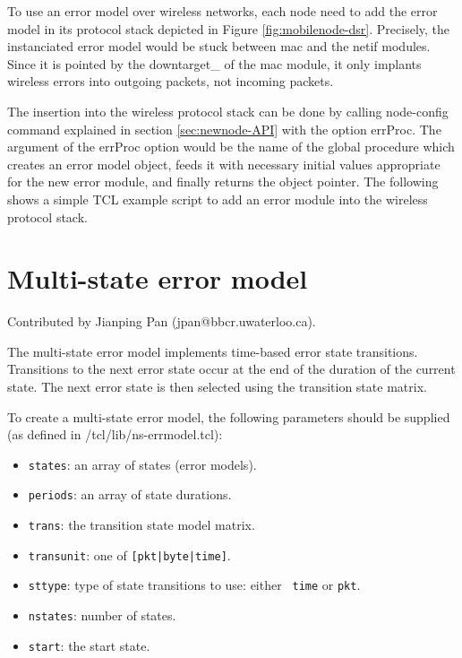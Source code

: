 To use an error model over wireless networks, each node need to add
the error model in its protocol stack depicted in
Figure \ref{fig:mobilenode-dsr}. Precisely, the instanciated error
model would be stuck between mac and the netif modules. Since it is
pointed by the downtarget\_ of the mac module, it only implants
wireless errors into outgoing packets, not incoming packets.

The insertion into the wireless protocol stack can be done by calling
node-config command explained in section \ref{sec:newnode-API} with
the option errProc. The argument of the errProc option would be the
name of the global procedure which creates an error model object,
feeds it with necessary initial values appropriate for the new error
module, and finally returns the object pointer. The following shows a
simple TCL example script to add an error module into the wireless
protocol stack.

\section{Multi-state error model}

Contributed by Jianping Pan (jpan@bbcr.uwaterloo.ca).

The multi-state error model implements time-based error state
transitions. Transitions to the next  
error state occur at the end of the duration of the current state. The
next error state is then selected using the 
transition state matrix.

To create a multi-state error model, the following parameters should
be supplied (as defined in \ns/tcl/lib/ns-errmodel.tcl): 
\begin{itemize}
\item {\tt states}: an array of states (error models).
\item {\tt periods}: an array of state durations.
\item {\tt trans}: the transition state model matrix.
\item {\tt transunit}: one of {\tt [pkt|byte|time]}.
\item {\tt sttype}: type of state transitions to use: either {\tt
    time} or {\tt pkt}.
\item {\tt nstates}: number of states.
\item {\tt start}: the start state.
\end{itemize}

